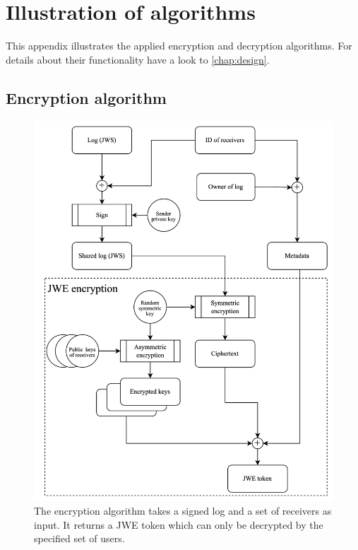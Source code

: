\documentclass[../main.tex]{subfiles}
\begin{document}
\chapter{Illustration of algorithms}

This appendix illustrates the applied encryption and decryption algorithms.
For details about their functionality have a look to \cref{chap:design}.

\section{Encryption algorithm}
\label{app:encryption}
\begin{figure}[h]
    \includegraphics[scale=0.158]{../img/05/encrypt_logs.png}
    \centering
    \caption[Encryption algorithm]{The encryption algorithm takes a signed log and a set of receivers as input. It returns a JWE token which can only be decrypted by the specified set of users.}
    \label{app:encryption_algo}
\end{figure}
\newpage
\end{document}
